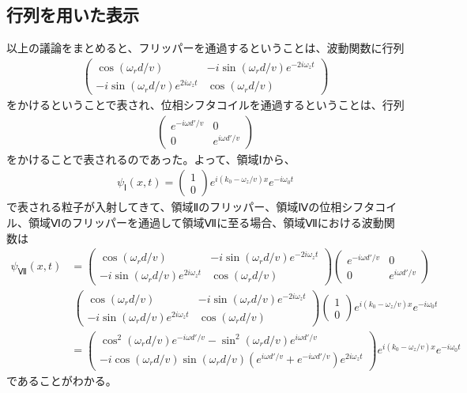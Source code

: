 \subsection{行列を用いた表示}
以上の議論をまとめると、フリッパーを通過するということは、波動関数に行列
\begin{align}
\begin{pmatrix}
\cos({{\omega_{r}}d/v}) &-i\sin({{\omega_{r}}d/v})e^{-2i\omega_{z}t} \\
-i\sin({{\omega_{r}}d/v})e^{2i\omega_{z}t} &\cos({{\omega_{r}}d/v})
\end{pmatrix}
\end{align}
をかけるということで表され、位相シフタコイルを通過するということは、行列
\begin{align}
\begin{pmatrix}
 e^{-i{\omega}d'/v}& 0 \\
 0 &e^{i{\omega}d'/v}
\end{pmatrix}
\end{align}
をかけることで表されるのであった。よって、領域Ⅰから、
\begin{align}
{\psi}_{Ⅰ}(x,t)=
\begin{pmatrix}
1 \\
0
\end{pmatrix}
e^{i(k_{0}-\omega_{z}/v)x}e^{-i\omega_{0}t}
\end{align}
で表される粒子が入射してきて、領域Ⅱのフリッパー、領域Ⅳの位相シフタコイル、領域Ⅵのフリッパーを通過して領域Ⅶに至る場合、領域Ⅶにおける波動関数は
\begin{align}
{\psi}_{Ⅶ}(x,t)
&=\begin{pmatrix}
\cos({{\omega_{r}}d/v}) &-i\sin({{\omega_{r}}d/v})e^{-2i\omega_{z}t} \\
-i\sin({{\omega_{r}}d/v})e^{2i\omega_{z}t} &\cos({{\omega_{r}}d/v})
\end{pmatrix}
\begin{pmatrix}
 e^{-i{\omega}d'/v}& 0 \\
 0 &e^{i{\omega}d'/v}
\end{pmatrix}　\\
&{\ }\begin{pmatrix}
\cos({{\omega_{r}}d/v}) &-i\sin({{\omega_{r}}d/v})e^{-2i\omega_{z}t} \\
-i\sin({{\omega_{r}}d/v})e^{2i\omega_{z}t} &\cos({{\omega_{r}}d/v})
\end{pmatrix}
\begin{pmatrix}
1 \\
0
\end{pmatrix}
e^{i(k_{0}-\omega_{z}/v)x}e^{-i\omega_{0}t} \\
&=\begin{pmatrix}
\cos^{2}(\omega_{r}d/v)e^{-i{\omega}d'/v}-\sin^{2}(\omega_{r}d/v)e^{i{\omega}d'/v} \\
-i\cos({{\omega_{r}}d/v})\sin(\omega_{r}d/v)(e^{i{\omega}d'/v}+e^{-i{\omega}d'/v})e^{2i\omega_{z}t}
\end{pmatrix}
e^{i(k_{0}-\omega_{z}/v)x}e^{-i\omega_{0}t}
\end{align}
であることがわかる。
